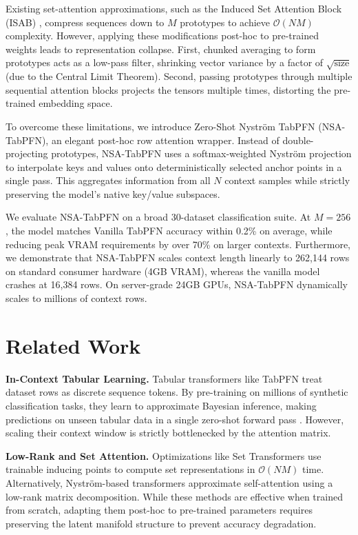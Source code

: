 \documentclass{article} %
\begin{document}
Existing set-attention approximations, such as the Induced Set Attention Block (ISAB) \citep{lee2019set}, compress sequences down to $M$ prototypes to achieve $\mathcal{O}(NM)$ complexity. However, applying these modifications post-hoc to pre-trained weights leads to representation collapse. First, chunked averaging to form prototypes acts as a low-pass filter, shrinking vector variance by a factor of $\sqrt{\text{size}}$ (due to the Central Limit Theorem). Second, passing prototypes through multiple sequential attention blocks projects the tensors multiple times, distorting the pre-trained embedding space. 

To overcome these limitations, we introduce Zero-Shot Nystr\"om TabPFN (NSA-TabPFN), an elegant post-hoc row attention wrapper. Instead of double-projecting prototypes, NSA-TabPFN uses a softmax-weighted Nystr\"om projection to interpolate keys and values onto deterministically selected anchor points in a single pass. This aggregates information from all $N$ context samples while strictly preserving the model's native key/value subspaces.

We evaluate NSA-TabPFN on a broad 30-dataset classification suite. At $M=256$, the model matches Vanilla TabPFN accuracy within 0.2\% on average, while reducing peak VRAM requirements by over 70\% on larger contexts. Furthermore, we demonstrate that NSA-TabPFN scales context length linearly to 262,144 rows on standard consumer hardware (4GB VRAM), whereas the vanilla model crashes at 16,384 rows. On server-grade 24GB GPUs, NSA-TabPFN dynamically scales to millions of context rows.

\section{Related Work}

\textbf{In-Context Tabular Learning.} Tabular transformers like TabPFN treat dataset rows as discrete sequence tokens. By pre-training on millions of synthetic classification tasks, they learn to approximate Bayesian inference, making predictions on unseen tabular data in a single zero-shot forward pass \citep{hollmann2022tabpfn}. However, scaling their context window is strictly bottlenecked by the attention matrix.

\textbf{Low-Rank and Set Attention.} Optimizations like Set Transformers \citep{lee2019set} use trainable inducing points to compute set representations in $\mathcal{O}(NM)$ time. Alternatively, Nystr\"om-based transformers \citep{xiong2021nystromformer} approximate self-attention using a low-rank matrix decomposition. While these methods are effective when trained from scratch, adapting them post-hoc to pre-trained parameters requires preserving the latent manifold structure to prevent accuracy degradation.
\end{document}
